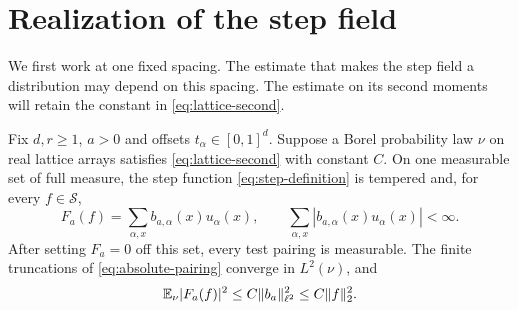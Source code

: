 \section{Realization of the step field}\label{sec:realization}
We first work at one fixed spacing. The estimate that makes the
step field a distribution may depend on this spacing. The estimate
on its second moments will retain the constant in
\eqref{eq:lattice-second}.

\begin{proposition}\label{prop:step-realization}
Fix $d,r\ge1$, $a>0$ and offsets $t_\alpha\in[0,1]^d$.
Suppose a Borel probability law $\nu$ on real lattice arrays
satisfies \eqref{eq:lattice-second} with constant $C$.
On one measurable set of full measure, the step function
\eqref{eq:step-definition} is tempered and, for every $f\in\mathcal S$,
\begin{equation}\label{eq:absolute-pairing}
 F_a(f)=\sum_{\alpha,x}b_{a,\alpha}(x)u_\alpha(x),\qquad
 \sum_{\alpha,x}|b_{a,\alpha}(x)u_\alpha(x)|<\infty.
\end{equation}
After setting $F_a=0$ off this set, every test pairing is measurable.
The finite truncations of \eqref{eq:absolute-pairing} converge in
$L^2(\nu)$, and
\[
 \mathbb E_\nu|F_a(f)|^2\le C\|b_a\|_{\ell^2}^2\le C\|f\|_2^2.
\]
\end{proposition}

